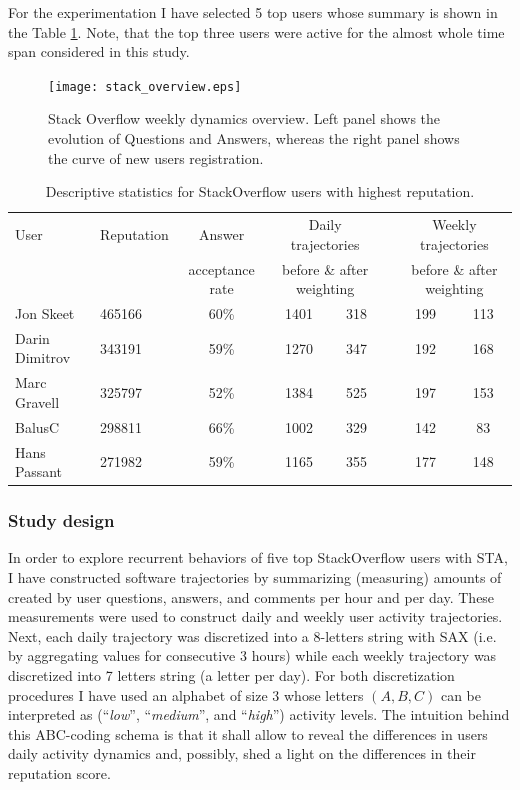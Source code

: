 For the experimentation I have selected 5 top users whose summary is shown in the Table \ref{so_table}. Note, that the top three users were active for the almost whole time span considered in this study.

\begin{figure}
\centering
\texttt{[image: stack\_overview.eps]}
\caption{Stack Overflow weekly dynamics overview. Left panel shows the evolution of Questions and Answers, whereas the right panel shows the curve of new users registration.}
\label{fig:stack_dynamics}   
\end{figure}

\begin{table}[]
\begin{small}
\begin{tabularx}{\linewidth}{l X c c c c c c}
\toprule
User   & Reputation   &   Answer & \multicolumn{2}{c}{Daily  trajectories} & & \multicolumn{2}{c}{Weekly trajectories}\\
& & acceptance rate & \multicolumn{2}{c}{before \& after weighting} & & \multicolumn{2}{c}{before \& after weighting}\\
\midrule
Jon Skeet   & 465166 & 60\% &1401 & 318 & \qquad & 199 & 113 \\
Darin Dimitrov   &  343191 & 59\% & 1270  & 347 & &192 & 168\\
Marc Gravell & 325797 & 52\%  &1384 &525 & &197 & 153 \\
BalusC  & 298811 & 66\% &1002 &329 & &142 & 83 \\
Hans Passant & 271982 & 59\% &1165    &355 & &177 & 148\\
\bottomrule
\end{tabularx}
\caption{Descriptive statistics for StackOverflow users with highest reputation.}
\label{so_table}
\end{small}
\end{table}

\subsubsection{Study design}
In order to explore recurrent behaviors of five top StackOverflow users with STA, I have constructed software trajectories by summarizing (measuring) amounts of created by user questions, answers, and comments per hour and per day. These measurements were used to construct daily and weekly user activity trajectories. Next, each daily trajectory was discretized into a 8-letters string with SAX (i.e. by aggregating values for consecutive 3 hours) while each weekly trajectory was discretized into 7 letters string (a letter per day). For both discretization procedures I have used an alphabet of size 3 whose letters $(A,B,C)$ can be interpreted as (``\textit{low}'', ``\textit{medium}'', and ``\textit{high}'') activity levels. The intuition behind this ABC-coding schema is that it shall allow to reveal the differences in users daily activity dynamics and, possibly, shed a light on the differences in their reputation score.


